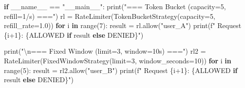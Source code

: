\documentclass[11pt]{article}
\newenvironment{Shaded}{\begin{snugshade}}{\end{snugshade}}
\newcommand{\BuiltInTok}[1]{\textcolor[rgb]{0.50,0.55,0.55}{#1}}
\newcommand{\CharTok}[1]{\textcolor[rgb]{0.24,0.68,0.91}{#1}}
\newcommand{\ControlFlowTok}[1]{\textcolor[rgb]{0.99,0.74,0.29}{\textbf{#1}}}
\newcommand{\DecValTok}[1]{\textcolor[rgb]{0.96,0.45,0.00}{#1}}
\newcommand{\FloatTok}[1]{\textcolor[rgb]{0.96,0.45,0.00}{#1}}
\newcommand{\KeywordTok}[1]{\textcolor[rgb]{0.81,0.81,0.76}{\textbf{#1}}}
\newcommand{\NormalTok}[1]{\textcolor[rgb]{0.81,0.81,0.76}{#1}}
\newcommand{\OperatorTok}[1]{\textcolor[rgb]{0.81,0.81,0.76}{#1}}
\newcommand{\SpecialCharTok}[1]{\textcolor[rgb]{0.24,0.68,0.91}{#1}}
\newcommand{\SpecialStringTok}[1]{\textcolor[rgb]{0.85,0.27,0.33}{#1}}
\newcommand{\StringTok}[1]{\textcolor[rgb]{0.96,0.31,0.31}{#1}}
\newcommand{\VariableTok}[1]{\textcolor[rgb]{0.15,0.68,0.68}{#1}}
\begin{document}
\begin{Shaded}
\begin{Highlighting}[]
\ControlFlowTok{if} \VariableTok{\_\_name\_\_} \OperatorTok{==} \StringTok{"\_\_main\_\_"}\NormalTok{:}
    \BuiltInTok{print}\NormalTok{(}\StringTok{"=== Token Bucket (capacity=5, refill=1/s) ==="}\NormalTok{)}
\NormalTok{    rl }\OperatorTok{=}\NormalTok{ RateLimiter(TokenBucketStrategy(capacity}\OperatorTok{=}\DecValTok{5}\NormalTok{, refill\_rate}\OperatorTok{=}\FloatTok{1.0}\NormalTok{))}
    \ControlFlowTok{for}\NormalTok{ i }\KeywordTok{in} \BuiltInTok{range}\NormalTok{(}\DecValTok{7}\NormalTok{):}
\NormalTok{        result }\OperatorTok{=}\NormalTok{ rl.allow(}\StringTok{"user\_A"}\NormalTok{)}
        \BuiltInTok{print}\NormalTok{(}\SpecialStringTok{f"  Request }\SpecialCharTok{\{}\NormalTok{i}\OperatorTok{+}\DecValTok{1}\SpecialCharTok{\}}\SpecialStringTok{: }\SpecialCharTok{\{}\StringTok{\textquotesingle{}ALLOWED\textquotesingle{}} \ControlFlowTok{if}\NormalTok{ result }\ControlFlowTok{else} \StringTok{\textquotesingle{}DENIED\textquotesingle{}}\SpecialCharTok{\}}\SpecialStringTok{"}\NormalTok{)}

    \BuiltInTok{print}\NormalTok{(}\StringTok{"}\CharTok{\textbackslash{}n}\StringTok{=== Fixed Window (limit=3, window=10s) ==="}\NormalTok{)}
\NormalTok{    rl2 }\OperatorTok{=}\NormalTok{ RateLimiter(FixedWindowStrategy(limit}\OperatorTok{=}\DecValTok{3}\NormalTok{, window\_seconds}\OperatorTok{=}\DecValTok{10}\NormalTok{))}
    \ControlFlowTok{for}\NormalTok{ i }\KeywordTok{in} \BuiltInTok{range}\NormalTok{(}\DecValTok{5}\NormalTok{):}
\NormalTok{        result }\OperatorTok{=}\NormalTok{ rl2.allow(}\StringTok{"user\_B"}\NormalTok{)}
        \BuiltInTok{print}\NormalTok{(}\SpecialStringTok{f"  Request }\SpecialCharTok{\{}\NormalTok{i}\OperatorTok{+}\DecValTok{1}\SpecialCharTok{\}}\SpecialStringTok{: }\SpecialCharTok{\{}\StringTok{\textquotesingle{}ALLOWED\textquotesingle{}} \ControlFlowTok{if}\NormalTok{ result }\ControlFlowTok{else} \StringTok{\textquotesingle{}DENIED\textquotesingle{}}\SpecialCharTok{\}}\SpecialStringTok{"}\NormalTok{)}


\end{Highlighting}
\end{Shaded}
\end{document}

